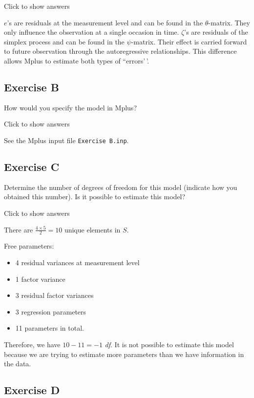 \documentclass[
]{book}
\providecommand{\tightlist}{%
  \setlength{\itemsep}{0pt}\setlength{\parskip}{0pt}}
\begin{document}
Click to show answers

\(e\)'s are residuals at the measurement level and can be found in the \(\theta\)-matrix. They only influence the observation at a single occasion in time. \(\zeta\)'s are residuals of the simplex process and can be found in the \(\psi\)-matrix. Their effect is carried forward to future observation through the autoregressive relationships. This difference allows Mplus to estimate both types of ``errors'\,'.

\hypertarget{exercise-b}{%
\subsection{Exercise B}\label{exercise-b}}

How would you specify the model in Mplus?

Click to show answers

See the Mplus input file \texttt{Exercise\ B.inp}.

\hypertarget{exercise-c}{%
\subsection{Exercise C}\label{exercise-c}}

Determine the number of degrees of freedom for this model (indicate how you obtained this number). Is it possible to estimate this model?

Click to show answers

There are \(\frac{4 \times 5}{2} = 10\) unique elements in \(S\).

Free parameters:

\begin{itemize}
\tightlist
\item
  4 residual variances at measurement level
\item
  1 factor variance
\item
  3 residual factor variances
\item
  3 regression parameters
\item
  11 parameters in total.
\end{itemize}

Therefore, we have \(10 - 11 = -1\) \emph{df}. It is not possible to estimate this model because we are trying to estimate more parameters than we have information in the data.

\hypertarget{exercise-d}{%
\subsection{Exercise D}\label{exercise-d}}
\end{document}
